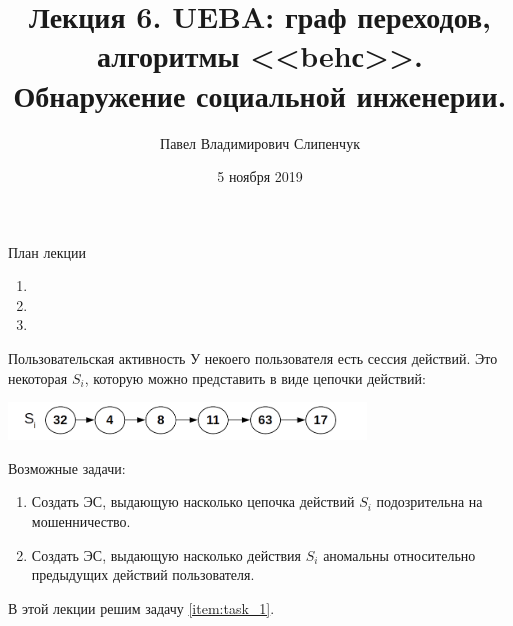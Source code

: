 


\title{Лекция 6. UEBA: граф переходов, алгоритмы <<behс>>. Обнаружение социальной инженерии.}


\date{5 ноября 2019}
\author{Павел Владимирович Слипенчук }


  \maketitle
    
\begin{frame}{План лекции}
    \begin{enumerate}
    	\item {}
    	\item {}
    	\item {}
	\end{enumerate}
\end{frame}

\begin{frame}{Пользовательская активность}
	\small
	У некоего пользователя есть сессия действий. Это некоторая $S_i$, 
	которую можно представить в виде цепочки действий:
	\begin{center}
		\includegraphics[width=9.5cm]{../pic/beh/chain.png}
	\end{center}
	
	Возможные задачи:
	\begin{enumerate}
		\item Создать ЭС, выдающую  насколько цепочка действий $S_i$ подозрительна на мошенничество. \label{item:task_1}
		\item Создать ЭС, выдающую  насколько действия $S_i$ аномальны
		относительно предыдущих действий пользователя.
	\end{enumerate}
	
	В этой лекции решим задачу \ref{item:task_1}.
\end{frame}

